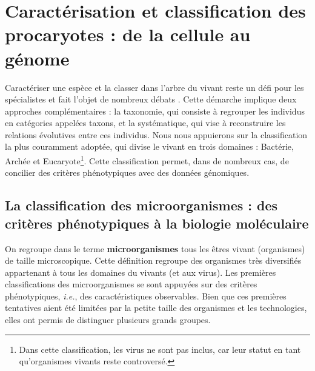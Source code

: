 \chapter{Caractérisation et classification des procaryotes : de la cellule au génome}

Caractériser une espèce et la classer dans l'arbre du vivant reste un défi pour les spécialistes et fait l’objet de nombreux débats \cite{chun_integrating_2014,adl_revisions_2019}. Cette démarche implique deux approches complémentaires : la taxonomie, qui consiste à regrouper les individus en catégories appelées taxons, et la systématique, qui vise à reconstruire les relations évolutives entre ces individus. Nous nous appuierons sur la classification la plus couramment adoptée, qui divise le vivant en trois domaines : Bactérie, Archée et Eucaryote\footnote{Dans cette classification, les virus ne sont pas inclus, car leur statut en tant qu’organismes vivants reste controversé.}. Cette classification permet, dans de nombreux cas, de concilier des critères phénotypiques avec des données génomiques.

\section{La classification des microorganismes : des critères phénotypiques à la biologie moléculaire}

On regroupe dans le terme \textbf{microorganismes} tous les êtres vivant (organismes) de taille microscopique. Cette définition regroupe des organismes très diversifiés appartenant à tous les domaines du vivants (et aux virus). Les premières classifications des microorganismes se sont appuyées sur des critères phénotypiques, \textit{i.e.}, des caractéristiques observables. Bien que ces premières tentatives aient été limitées par la petite taille des organismes et les technologies, elles ont permis de distinguer plusieurs grands groupes.


